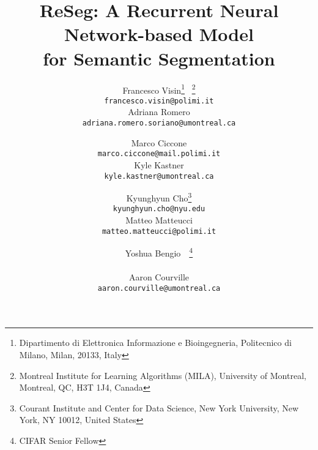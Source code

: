 \documentclass[times,art10,twocolumn,latex8]{article}
\begin{document}
\title{ReSeg: A Recurrent Neural Network-based Model \\for Semantic Segmentation}

\author{Francesco Visin\thanks{Dipartimento di Elettronica
Informazione e Bioingegneria,
Politecnico di Milano,
Milan, 20133, Italy}
~\thanks{Montreal Institute for Learning Algorithms (MILA),
University of Montreal,
Montreal, QC, H3T 1J4, Canada
}\\
{\tt\small francesco.visin@polimi.it}
\\
Adriana Romero\footnotemark[2]\\
{\tt\small adriana.romero.soriano@umontreal.ca}
\and
Marco Ciccone\footnotemark[1]\\
{\tt\small marco.ciccone@mail.polimi.it}
\\
Kyle Kastner\footnotemark[2]\\
{\tt\small kyle.kastner@umontreal.ca}
\and
\hspace{1.2cm}
Kyunghyun Cho\thanks{Courant Institute and Center for Data Science,
New York University,
New York, NY 10012, United States}\\
\hspace{1.2cm}
{\tt\small kyunghyun.cho@nyu.edu}
\\
\hspace{1.2cm}
Matteo Matteucci\footnotemark[1]\\
\hspace{1.2cm}
{\tt\small matteo.matteucci@polimi.it}
\and
\hspace{1cm}
Yoshua Bengio\footnotemark[2]~~\thanks{CIFAR Senior Fellow}\\
\hspace{1cm}{\tt\small yoshua.bengio@umontreal.ca}
\\
\hspace{1cm}
Aaron Courville\footnotemark[2]\\
\hspace{1cm}
{\tt\small aaron.courville@umontreal.ca}
}

\maketitle
\end{document}
